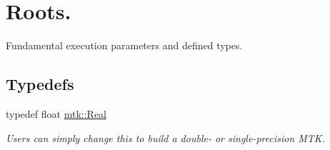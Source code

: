 \hypertarget{group__c01-roots}{\section{Roots.}
\label{group__c01-roots}
}


Fundamental execution parameters and defined types.  


\subsection*{Typedefs}
\begin{DoxyCompactItemize}
\item 
typedef float \hyperlink{group__c01-roots_gac080bbbf5cbb5502c9f00405f894857d}{mtk\+::\+Real}
\begin{DoxyCompactList}\small\item\em Users can simply change this to build a double-\/ or single-\/precision M\+T\+K. \end{DoxyCompactList}\end{DoxyCompactItemize}
